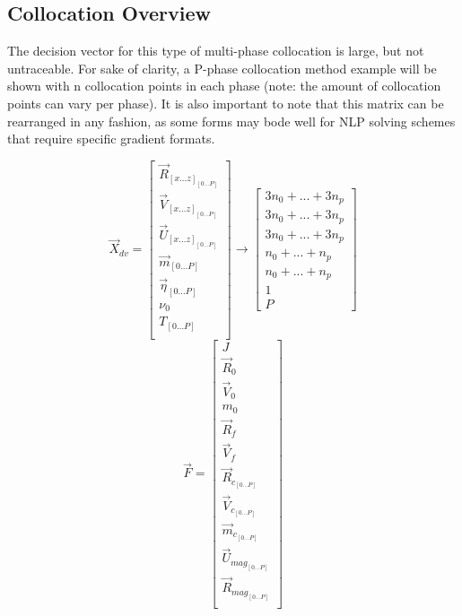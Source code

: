 \subsection{Collocation Overview}
The decision vector for this type of multi-phase collocation is large, but not untraceable. For sake of clarity, a P-phase collocation method example will be shown with n collocation points in each phase (note: the amount of collocation points can vary per phase). It is also important to note that this matrix can be rearranged in any fashion, as some forms may bode well for NLP solving schemes that require specific gradient formats.
\begin{multicols}{2}
\begin{equation}
\vec{X}_{dv} = 
\begin{bmatrix}
\vec{R}_{[x ... z]_{[0 ... P]}} \\
\vec{V}_{[x ... z]_{[0 ... P]}} \\
\vec{U}_{[x ... z]_{[0 ... P]}} \\
\vec{m}_{[0 ... P]} \\
\vec{\eta }_{[0 ... P]} \\
\nu_0 \\
T_{[0 ... P]} \\
\end{bmatrix}
\rightarrow
\begin{bmatrix}
3 n_0 + ... + 3 n_p \\
3 n_0 + ... + 3 n_p \\
3 n_0 + ... + 3 n_p \\
n_0 + ... + n_p \\
n_0 + ... + n_p \\
1 \\
P 
\end{bmatrix}
\end{equation} 
\break
\begin{equation}
\vec{F} = 
\begin{bmatrix}
J \\
\vec{R}_0 \\
\vec{V}_0 \\
m_0 \\
\vec{R}_f \\
\vec{V}_f \\
\vec{R}_{c_{[0 ... P]}} \\
\vec{V}_{c_{[0 ... P]}} \\
\vec{m}_{c_{[0 ... P]}} \\
\vec{U}_{mag_{[0 ... P]}} \\
\vec{R}_{mag_{[0 ... P]}} \\

\end{bmatrix}
\end{equation}
\end{multicols}

